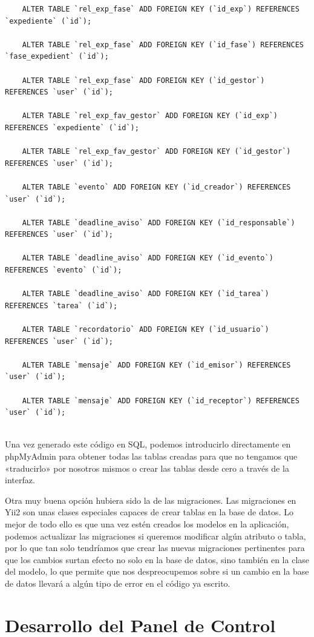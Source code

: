\begin{verbatim}
	ALTER TABLE `rel_exp_fase` ADD FOREIGN KEY (`id_exp`) REFERENCES `expediente` (`id`);
	
	ALTER TABLE `rel_exp_fase` ADD FOREIGN KEY (`id_fase`) REFERENCES `fase_expedient` (`id`);
	
	ALTER TABLE `rel_exp_fase` ADD FOREIGN KEY (`id_gestor`) REFERENCES `user` (`id`);
	
	ALTER TABLE `rel_exp_fav_gestor` ADD FOREIGN KEY (`id_exp`) REFERENCES `expediente` (`id`);
	
	ALTER TABLE `rel_exp_fav_gestor` ADD FOREIGN KEY (`id_gestor`) REFERENCES `user` (`id`);
	
	ALTER TABLE `evento` ADD FOREIGN KEY (`id_creador`) REFERENCES `user` (`id`);
	
	ALTER TABLE `deadline_aviso` ADD FOREIGN KEY (`id_responsable`) REFERENCES `user` (`id`);
	
	ALTER TABLE `deadline_aviso` ADD FOREIGN KEY (`id_evento`) REFERENCES `evento` (`id`);
	
	ALTER TABLE `deadline_aviso` ADD FOREIGN KEY (`id_tarea`) REFERENCES `tarea` (`id`);
	
	ALTER TABLE `recordatorio` ADD FOREIGN KEY (`id_usuario`) REFERENCES `user` (`id`);
	
	ALTER TABLE `mensaje` ADD FOREIGN KEY (`id_emisor`) REFERENCES `user` (`id`);
	
	ALTER TABLE `mensaje` ADD FOREIGN KEY (`id_receptor`) REFERENCES `user` (`id`);
	
\end{verbatim}

Una vez generado este código en SQL, podemos introducirlo directamente en phpMyAdmin para obtener todas las tablas creadas para que no tengamos que «traducirlo» por nosotros mismos o crear las tablas desde cero a través de la interfaz.

Otra muy buena opción hubiera sido la de las migraciones. Las migraciones en Yii2 son unas clases especiales capaces de crear tablas en la base de datos. Lo mejor de todo ello es que una vez estén creados los modelos en la aplicación, podemos actualizar las migraciones si queremos modificar algún atributo o tabla, por lo que tan solo tendríamos que crear las nuevas migraciones pertinentes para que los cambios surtan efecto no solo en la base de datos, sino también en la clase del modelo, lo que permite que nos despreocupemos sobre si un cambio en la base de datos llevará a algún tipo de error en el código ya escrito.

\section{Desarrollo del Panel de Control}

